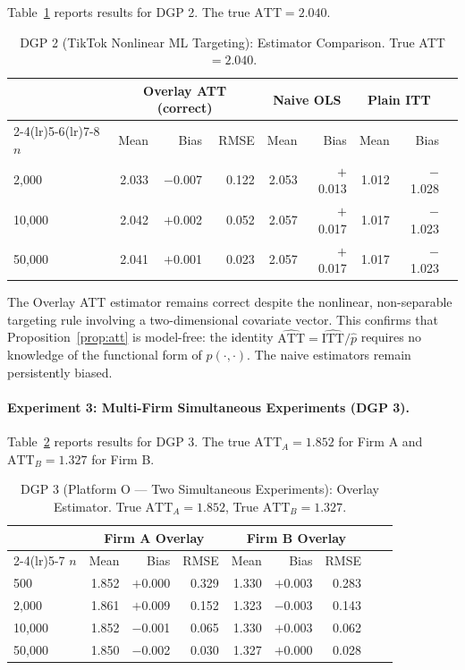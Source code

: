 \documentclass[12pt]{article}
\newcommand{\ATT}{\mathrm{ATT}}
\newcommand{\ITT}{\mathrm{ITT}}
\begin{document}
Table~\ref{tab:dgp2} reports results for DGP 2. The true $\ATT = 2.040$.

\begin{table}[h!]
\centering
\caption{DGP 2 (TikTok Nonlinear ML Targeting): Estimator Comparison.
True ATT $= 2.040$.}
\label{tab:dgp2}
\begin{tabular}{l rrrr rr rr}
\toprule
& \multicolumn{3}{c}{Overlay ATT (correct)} &
  \multicolumn{2}{c}{Naive OLS} &
  \multicolumn{2}{c}{Plain ITT} \\
\cmidrule(lr){2-4}\cmidrule(lr){5-6}\cmidrule(lr){7-8}
$n$ & Mean & Bias & RMSE & Mean & Bias & Mean & Bias \\
\midrule
2{,}000  & 2.033 & $-$0.007 & 0.122 & 2.053 & $+$0.013 & 1.012 & $-$1.028 \\
10{,}000 & 2.042 & $+$0.002 & 0.052 & 2.057 & $+$0.017 & 1.017 & $-$1.023 \\
50{,}000 & 2.041 & $+$0.001 & 0.023 & 2.057 & $+$0.017 & 1.017 & $-$1.023 \\
\bottomrule
\end{tabular}
\end{table}

The Overlay ATT estimator remains correct despite the nonlinear,
non-separable targeting rule involving a two-dimensional covariate vector.
This confirms that Proposition~\ref{prop:att} is model-free: the identity
$\hat{\ATT} = \hat{\ITT}/\hat{p}$ requires no knowledge of the functional
form of $p(\cdot,\cdot)$. The naive estimators remain persistently biased.

\paragraph{Experiment 3: Multi-Firm Simultaneous Experiments (DGP 3).}

Table~\ref{tab:dgp3} reports results for DGP 3. The true $\ATT_A = 1.852$
for Firm A and $\ATT_B = 1.327$ for Firm B.

\begin{table}[h!]
\centering
\caption{DGP 3 (Platform O --- Two Simultaneous Experiments):
Overlay Estimator. True $\ATT_A = 1.852$, True $\ATT_B = 1.327$.}
\label{tab:dgp3}
\begin{tabular}{l rrrr rrrr}
\toprule
& \multicolumn{3}{c}{Firm A Overlay} &
  \multicolumn{3}{c}{Firm B Overlay} \\
\cmidrule(lr){2-4}\cmidrule(lr){5-7}
$n$ & Mean & Bias & RMSE & Mean & Bias & RMSE \\
\midrule
500     & 1.852 & $+$0.000 & 0.329 & 1.330 & $+$0.003 & 0.283 \\
2{,}000  & 1.861 & $+$0.009 & 0.152 & 1.323 & $-$0.003 & 0.143 \\
10{,}000 & 1.852 & $-$0.001 & 0.065 & 1.330 & $+$0.003 & 0.062 \\
50{,}000 & 1.850 & $-$0.002 & 0.030 & 1.327 & $+$0.000 & 0.028 \\
\bottomrule
\end{tabular}
\end{table}
\end{document}
